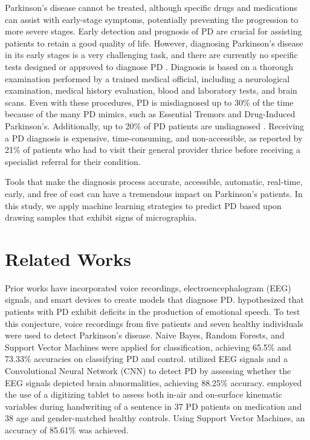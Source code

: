 \documentclass[pmlr,twocolumn,10pt]{jmlr} %
\begin{document}
Parkinson's disease cannot be treated, although specific drugs and medications can assist with early-stage symptoms, potentially preventing the progression to more severe stages. Early detection and prognosis of PD are crucial for assisting patients to retain a good quality of life. However, diagnosing Parkinson’s disease in its early stages is a very challenging task, and there are currently no specific tests designed or approved to diagnose PD \citep{national_institute_of_neurological_disorders_and_stroke}. Diagnosis is based on a thorough examination performed by a trained medical official, including a neurological examination, medical history evaluation, blood and laboratory tests, and brain scans. Even with these procedures, PD is misdiagnosed up to 30\% of the time because of the many PD mimics, such as Essential Tremors and Drug-Induced Parkinson’s. Additionally, up to 20\% of PD patients are undiagnosed \citep{schrag_ben-shlomo_quinn_2002}. Receiving a PD diagnosis is expensive, time-consuming, and non-accessible, as reported by 21\% of patients who had to visit their general provider thrice before receiving a specialist referral for their condition. \citep{gavidia_2020}

Tools that make the diagnosis process accurate, accessible, automatic, real-time, early, and free of cost can have a tremendous impact on Parkinson’s patients. In this study, we apply machine learning strategies to predict PD based upon drawing samples that exhibit signs of micrographia. 

\section{Related Works}
\label{related-works}
Prior works have incorporated voice recordings, electroencephalogram (EEG) signals, and smart devices to create models that diagnose PD. \citet{zhao2014automatic} hypothesized that patients with PD exhibit deficits in the production of emotional speech. To test this conjecture, voice recordings from five patients and seven healthy individuals were used to detect Parkinson’s disease. Naive Bayes, Random Forests, and Support Vector Machines were applied for classification, achieving 65.5\% and 73.33\% accuracies on classifying PD and control. \citet{oh2020deep} utilized EEG signals and a Convolutional Neural Network (CNN) to detect PD by assessing whether the EEG signals depicted brain abnormalities, achieving 88.25\% accuracy. \citet{drotar2014analysis} employed the use of a digitizing tablet to assess both in-air and on-surface kinematic variables during handwriting of a sentence in 37 PD patients on medication and 38 age and gender-matched healthy controls. Using Support Vector Machines, an accuracy of 85.61\% was achieved. 
\end{document}
